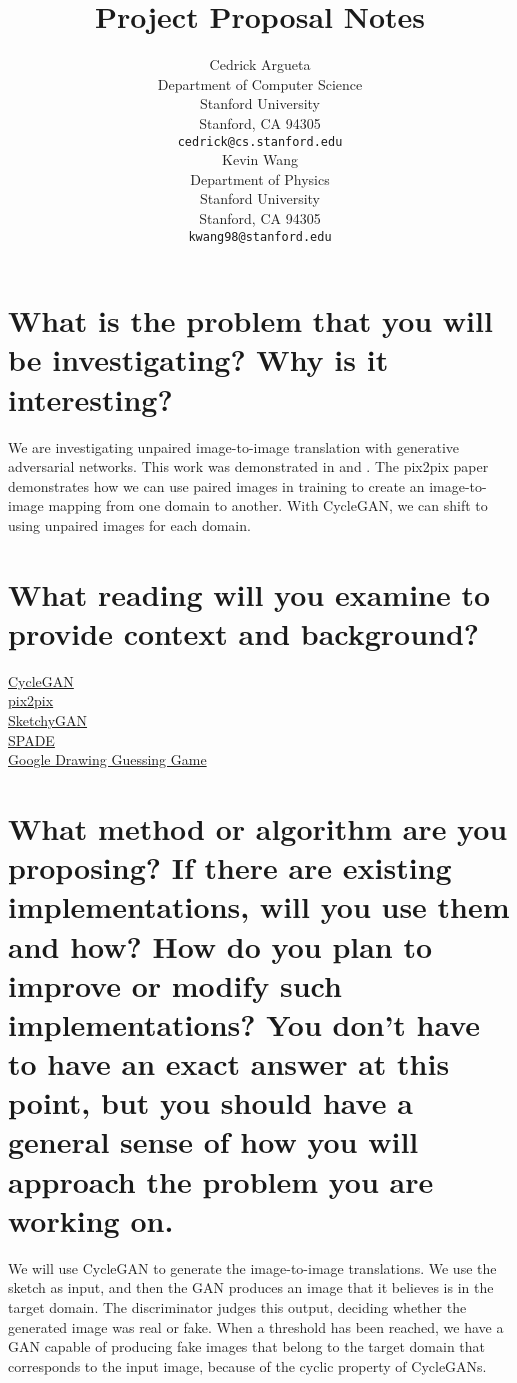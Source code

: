 \documentclass{article}
\title{Project Proposal Notes}
\author{
  Cedrick Argueta \\
  Department of Computer Science\\
  Stanford University\\
  Stanford, CA 94305 \\
  \texttt{cedrick@cs.stanford.edu} \\
  \And
  Kevin Wang \\
  Department of Physics\\
  Stanford University\\
  Stanford, CA 94305 \\
  \texttt{kwang98@stanford.edu} \\
}
\begin{document}

\maketitle

\begin{abstract}

 
\end{abstract}


\section{What is the problem that you will be investigating? Why is it interesting?}

We are investigating unpaired image-to-image translation with generative adversarial networks.
This work was demonstrated in \cite{cycleGAN} and \cite{pix2pix}.
The pix2pix paper demonstrates how we can use paired images in training to create an image-to-image mapping from one domain to another.
With CycleGAN, we can shift to using unpaired images for each domain.

\section{What reading will you examine to provide context and background?}

\href{https://arxiv.org/pdf/1703.10593.pdf}{CycleGAN} \\
\href{https://arxiv.org/abs/1611.07004}{pix2pix} \\
\href{https://arxiv.org/abs/1801.02753}{SketchyGAN} \\
\href{https://arxiv.org/abs/1903.07291}{SPADE} \\
\href{https://quickdraw.withgoogle.com/}{Google Drawing Guessing Game} \\

\section{What method or algorithm are you proposing? If there are existing implementations, will you use them and how? How do you plan to improve or modify such implementations? You don't have to have an exact answer at this point, but you should have a general sense of how you will approach the problem you are working on. }

We will use CycleGAN to generate the image-to-image translations.
We use the sketch as input, and then the GAN produces an image that it believes is in the target domain. 
The discriminator judges this output, deciding whether the generated image was real or fake.
When a threshold has been reached, we have a GAN capable of producing fake images that belong to the target domain that corresponds to the input image, because of the cyclic property of CycleGANs.
\end{document}

